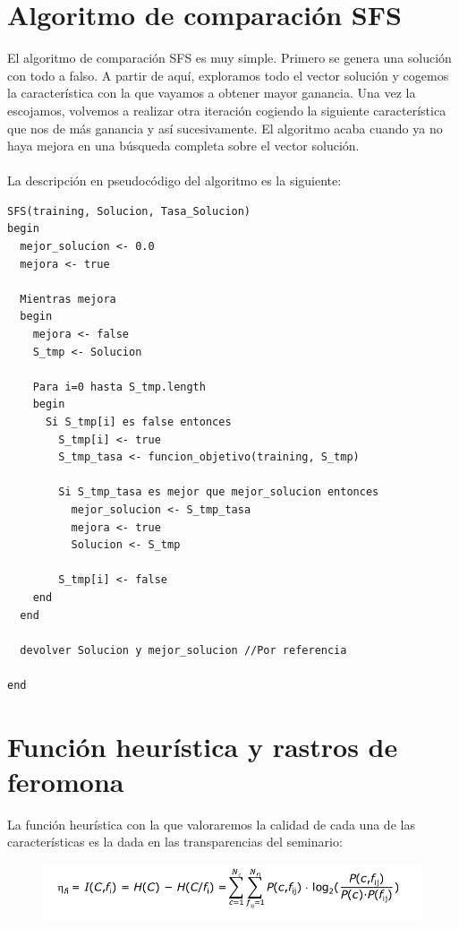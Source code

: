 	\section{Algoritmo de comparación SFS}
	El algoritmo de comparación SFS es muy simple. Primero se genera una solución con todo a
	falso. A partir de aquí, exploramos todo el vector solución y cogemos la característica con la que
	vayamos a obtener mayor ganancia. Una vez la escojamos, volvemos a realizar otra iteración cogiendo la siguiente característica que nos de más ganancia y así sucesivamente. El algoritmo acaba cuando ya no haya mejora en una búsqueda completa sobre el vector solución.
	\\
	\\
	La descripción en pseudocódigo del algoritmo es la siguiente:
	\begin{lstlisting}
SFS(training, Solucion, Tasa_Solucion)
begin
  mejor_solucion <- 0.0
  mejora <- true
  
  Mientras mejora
  begin
    mejora <- false
    S_tmp <- Solucion
    
    Para i=0 hasta S_tmp.length
    begin
      Si S_tmp[i] es false entonces
        S_tmp[i] <- true
        S_tmp_tasa <- funcion_objetivo(training, S_tmp)
        
        Si S_tmp_tasa es mejor que mejor_solucion entonces
          mejor_solucion <- S_tmp_tasa
          mejora <- true
          Solucion <- S_tmp
          
        S_tmp[i] <- false
    end
  end
  
  devolver Solucion y mejor_solucion //Por referencia
  
end
	\end{lstlisting}


	\section{Función heurística y rastros de feromona}
	La función heurística con la que valoraremos la calidad de cada una de las características es la dada en las transparencias del seminario:
	\begin{figure} [H]
	\centering
	\includegraphics[width=1.0\linewidth]{heuristica}
	\label{fig:heuristica}
	\end{figure}
	
